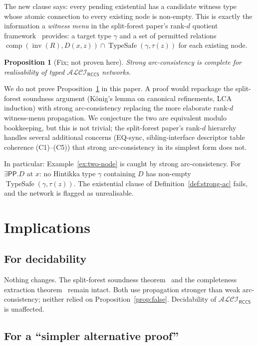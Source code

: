 \documentclass[11pt]{article}
\newtheorem{proposition}[theorem]{Proposition}
\theoremstyle{definition}
\theoremstyle{remark}
\newcommand{\PP}{\mathsf{PP}}
\newcommand{\comp}{\operatorname{comp}}
\newcommand{\inv}{\operatorname{inv}}
\newcommand{\TypeSafe}{\operatorname{TypeSafe}}
\newcommand{\ALCIRCC}[1]{\mathcal{ALCI}_{\mathsf{RCC#1}}}
\begin{document}
The new clause says: every pending existential has a candidate
witness type whose atomic connection to every existing node is
non-empty.  This is exactly the information a \emph{witness menu} in
the split-forest paper's rank-$d$ quotient
framework~\cite{SplitForest} provides: a target type $\gamma$ and a
set of permitted relations $\comp(\inv(R), D(x, z)) \cap
\TypeSafe(\gamma, \tau(z))$ for each existing node.

\begin{proposition}[Fix; not proven here]
\label{prop:fix}
Strong arc-consistency is complete for realisability of typed
$\ALCIRCC{5}$ networks.
\end{proposition}

We do not prove Proposition~\ref{prop:fix} in this paper.  A proof
would repackage the split-forest soundness argument (König's lemma
on canonical refinements, LCA induction) with strong arc-consistency
replacing the more elaborate rank-$d$ witness-menu propagation.  We
conjecture the two are equivalent modulo bookkeeping, but this is
not trivial; the split-forest paper's rank-$d$ hierarchy handles
several additional concerns (EQ-sync, sibling-interface descriptor
table coherence (C1)--(C5)) that strong arc-consistency in its
simplest form does not.

In particular: Example~\ref{ex:two-node} is caught by strong
arc-consistency.  For $\exists \PP. D$ at $x$: no Hintikka type
$\gamma$ containing $D$ has non-empty $\TypeSafe(\gamma, \tau(z))$.
The existential clause of Definition~\ref{def:strong-ac} fails, and
the network is flagged as unrealisable.

\section{Implications}
\label{sec:impl}

\subsection{For decidability}

Nothing changes.  The split-forest soundness
theorem~\cite{SplitForest} and the completeness extraction
theorem~\cite{CompletenessExtraction} remain intact.  Both use
propagation stronger than weak arc-consistency; neither relied on
Proposition~\ref{prop:false}.  Decidability of $\ALCIRCC{5}$ is
unaffected.

\subsection{For a ``simpler alternative proof''}
\end{document}

